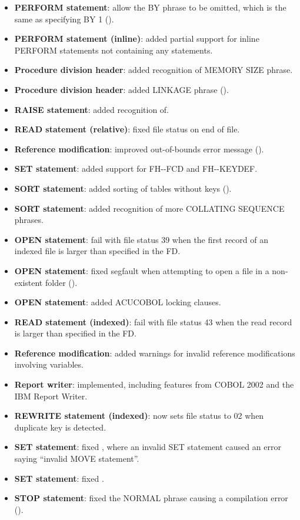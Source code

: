 \begin{itemize}
\item \textbf{PERFORM statement}: allow the BY phrase to be omitted, which is the same as specifying BY 1 ().
\item \textbf{PERFORM statement (inline)}: added partial support for inline PERFORM statements not containing any statements.
\item \textbf{Procedure division header}: added recognition of MEMORY SIZE phrase.
\item \textbf{Procedure division header}: added LINKAGE phrase ().
\item \textbf{RAISE statement}: added recognition of.
\item \textbf{READ statement (relative)}: fixed file status on end of file.
\item \textbf{Reference modification}: improved out-of-bounds error message ().
\item \textbf{SET statement}: added support for FH-{}-FCD and FH-{}-KEYDEF.
\item \textbf{SORT statement}: added sorting of tables without keys ().
\item \textbf{SORT statement}: added recognition of more COLLATING SEQUENCE phrases.
\item \textbf{OPEN statement}: fail with file status 39 when the first record of an indexed file is larger than specified in the FD.
\item \textbf{OPEN statement}: fixed segfault when attempting to open a file in a non-existent folder ().
\item \textbf{OPEN statement}: added ACUCOBOL locking clauses.
\item \textbf{READ statement (indexed)}: fail with file status 43 when the read record is larger than specified in the FD.
\item \textbf{Reference modification}: added warnings for invalid reference modifications involving variables.
\item \textbf{Report writer}: implemented, including features from COBOL 2002 and the IBM Report Writer.
\item \textbf{REWRITE statement (indexed)}: now sets file status to 02 when duplicate key is detected.
\item \textbf{SET statement}: fixed , where an invalid SET statement caused an error saying ``invalid MOVE statement''.
\item \textbf{SET statement}: fixed .
\item \textbf{STOP statement}: fixed the NORMAL phrase causing a compilation error ().

\end{itemize}
